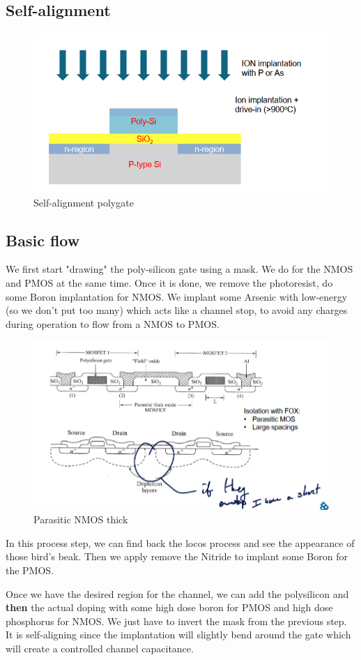 \documentclass{report}
\begin{document}
\subsection{Self-alignment}

\begin{figure}[H]
    \centering
    \includegraphics[width=0.5\linewidth]{self_alignment_poly.png}
    \caption{Self-alignment polygate}
    \label{fig:enter-label}
\end{figure}



\subsection{Basic flow}

We first start "drawing" the poly-silicon gate using a mask. We do for the NMOS and PMOS at the same time. Once it is done, we remove the photoresist, do some Boron implantation for NMOS. We implant some Arsenic with low-energy (so we don't put too many) which acts like a channel stop, to avoid any charges during operation to flow from a NMOS to PMOS.

\begin{figure}[H]
    \centering
    \includegraphics[width=0.5\linewidth]{parasitic_NMOS.png}
    \caption{Parasitic NMOS thick}
    \label{fig:enter-label}
\end{figure}

In this process step, we can find back the \gls{locos} process and see the appearance of those bird's beak. Then we apply remove the Nitride to implant some Boron for the PMOS.

Once we have the desired region for the channel, we can add the polysilicon and \textbf{then} the actual doping with some high dose boron for PMOS and high dose phosphorus for NMOS. We just have to invert the mask from the previous step. It is self-aligning since the implantation will slightly bend around the gate which will create a controlled channel capacitance.
\end{document}
